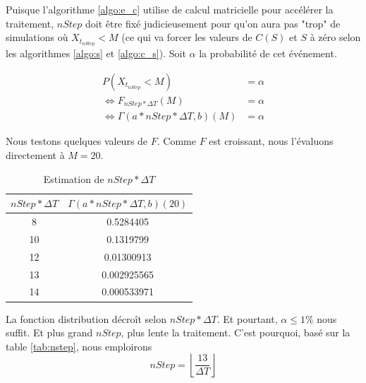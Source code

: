\documentclass[10pt,a4paper]{article}
\begin{document}
Puisque l'algorithme \eqref{algo:e_c} utilise de calcul matricielle pour accélérer la traitement, $nStep$ doit être fixé judicieusement pour qu'on aura pas "trop" de simulations où $X_{t_{nStep}} < M$ (ce qui va forcer les valeurs de $C(S)$ et $S$ à zéro selon les algorithmes \eqref{algo:s} et \eqref{algo:c_s}). Soit $\alpha$ la probabilité de cet événement.

\begin{align*}
    P\left( {{X_{{t_{nStep}}}} < M} \right) & = \alpha  \\
    \Leftrightarrow {F_{nStep*\Delta T}}\left( M \right) & = \alpha \\
    \Leftrightarrow \Gamma \left( {a*nStep*\Delta T,b} \right)\left( M \right) & = \alpha 
\end{align*}

Nous testons quelques valeurs de $F$. Comme $F$ est croissant, nous l'évaluons directement à $M=20$.

\begin{table}[!h]
    \centering
    \begin{tabular}{|c|c|}
      \hline
      $nStep * \Delta T$ &  $\Gamma \left( {a*nStep*\Delta T,b} \right)\left( 20 \right)$\\
      \hline
      8 & 0.5284405 \\
      10 & 0.1319799 \\
      12 & 0.01300913 \\
      13 & 0.002925565 \\
      14 & 0.000533971 \\
      \hline
    \end{tabular}
    \caption{Estimation de $nStep * \Delta T$}
    \label{tab:nstep}
\end{table}

La fonction distribution décroît selon $nStep*\Delta T$. Et pourtant, $\alpha \leq 1\%$ nous suffit. Et plus grand $nStep$, plus lente la traitement. C'est pourquoi, basé sur la table \eqref{tab:nstep}, nous emploirons
\[nStep = \left\lfloor {\frac{{13}}{{\Delta T}}} \right\rfloor \]
\end{document}
